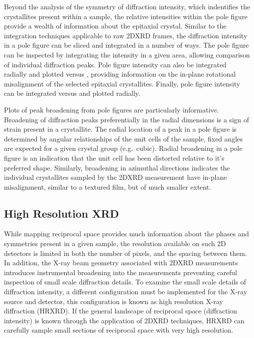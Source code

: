 Beyond the analysis of the symmetry of diffraction intensity, which indentifies the crystallites present within a sample, the relative intensities within the pole figure provide a wealth of information about the epitaxial crystal.
Similar to the integration techniques applicable to raw 2DXRD frames, the diffraction intensity in a pole figure can be sliced and integrated in a number of ways.
The pole figure can be inspected by integrating the intensity in a given area, allowing comparison of individual diffraction peaks.
Pole figure intensity can also be integrated radially and plotted versus \textphi{}, providing information on the in-plane rotational misalignment of the selected epitaxial crystallites.
Finally, pole figure intensity can be integrated versus \textphi{} and plotted radially.

Plots of peak broadening from pole figures are particularly informative.
Broadening of diffraction peaks preferentially in the radial dimensions is a sign of strain present in a crystallite.
The radial location of a peak in a pole figure is determined by angular relationships of the unit cells of the sample, fixed angles are expected for a given crystal group (e.g.\ cubic).
Radial broadening in a pole figure is an indication that the unit cell has been distorted relative to it's preferred shape.
Similarly, broadening in azimuthal directions indicates the individual crystallites sampled by the 2DXRD measurement have in-plane misalignment, similar to a textured film, but of much smaller extent.

\subsection{High Resolution XRD} While mapping reciprocal space provides much information about the phases and symmetries present in a given sample, the resolution available on such 2D detectors is limited in both the number of pixels, and the spacing between them.
In addition, the X-ray beam geometry associated with 2DXRD measurements introduces instrumental broadening into the measurements preventing careful inspection of small scale diffraction details.
To examine the small scale details of diffraction intensity, a different configuration must be implemented for the X-ray source and detector, this configuration is known as high resolution X-ray diffraction (HRXRD).
If the general landscape of reciprocal space (diffraction intensity) is known through the application of 2DXRD techniques, HRXRD can carefully sample small sections of reciprocal space with very high resolution.

